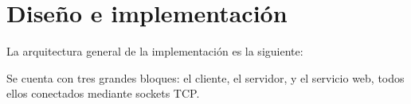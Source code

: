 \section{Diseño e implementación}

La arquitectura general de la implementación es la siguiente:

%     

Se cuenta con tres grandes bloques: el cliente, el servidor, y el servicio web, todos ellos conectados mediante sockets TCP.




